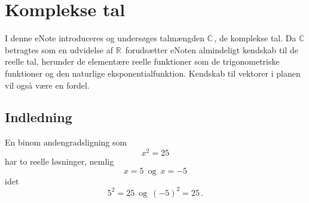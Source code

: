 
\setcounter{chapter}{28} %

\chapter{Komplekse tal} \label{tn29}






\begin{basis}
I denne eNote introduceres og undersøges talmængden $\mathbb C\,$, de komplekse tal. Da $\mathbb C\,$ betragtes som en udvidelse af $\mathbb R\,$ forudsætter eNoten almindeligt kendskab til de reelle tal, herunder de elementære reelle funktioner som de trigonometriske funktioner og den naturlige eksponentialfunktion. Kendskab til vektorer i planen vil også være en fordel.
\end{basis}

\section{Indledning}

En binom andengradsligning som
$$x^2=25$$
har to reelle løsninger, nemlig
$$x=5\,\,\,\mathrm{og}\,\,\,x=-5$$
idet
$$5^2=25\,\,\,\mathrm{og}\,\,\,(-5)^2=25\,.$$ 

